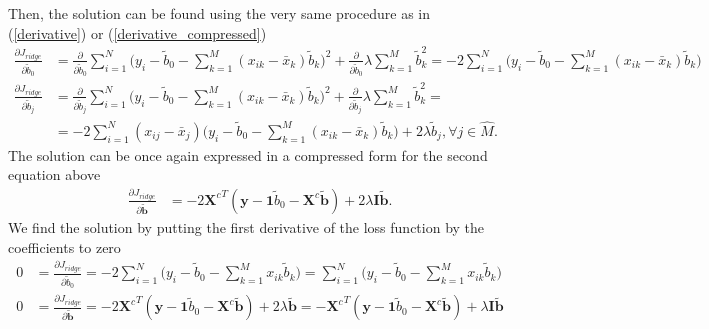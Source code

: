 \documentclass[11pt,oneside,czech,american]{book} %
\theoremstyle{plain}
\theoremstyle{definition}
\begin{document}
Then, the solution can be found using the very same procedure as in (\ref{derivative}) or (\ref{derivative_compressed})
\begin{equation}
	\begin{aligned}
		\frac{\partial J_{ridge}} {\partial \tilde{b}_0} &= \frac{\partial } {\partial \tilde{b}_0} \sum_{i=1}^{N} \Big(y_i - \tilde{b}_0 - \sum_{k=1}^{M} (x_{ik} - \bar{x}_k) \tilde{b}_k \Big)^2 + \frac{\partial } {\partial \tilde{b}_0} \lambda \sum_{k=1}^{M} \tilde{b}_k^2 = -2 \sum_{i=1}^{N} \Big(y_i - \tilde{b}_0 - \sum_{k=1}^{M} (x_{ik} - \bar{x}_k) \tilde{b}_k \Big) \\
		\frac{\partial J_{ridge}} {\partial \tilde{b}_j} &= \frac{\partial } {\partial \tilde{b}_j} \sum_{i=1}^{N} \Big(y_i - \tilde{b}_0 - \sum_{k=1}^{M} (x_{ik} - \bar{x}_k) \tilde{b}_k \Big)^2 + \frac{\partial } {\partial \tilde{b}_j} \lambda \sum_{k=1}^{M} \tilde{b}_k^2 =\\ 
		&= -2 \sum_{i=1}^{N} (x_{ij} - \bar{x}_j) \Big(y_i - \tilde{b}_0 - \sum_{k=1}^{M} (x_{ik} - \bar{x}_k) \tilde{b}_k \Big) + 2 \lambda \tilde{b}_j , \forall j \in \hat{M}.
	\end{aligned}
	\label{derivative_ridge}
\end{equation}
The solution can be once again expressed in a compressed form for the second equation above
\begin{equation}
	\begin{aligned}
		\frac{\partial J_{ridge}} {\partial \bm{\tilde{b}}} &= -2 {\bm{X}^{c}}^{T} (\bm{y} - \bm{1}\tilde{b}_0 -\bm{X}^c\bm{\tilde{b}}) + 2\lambda \bm{I} \bm{\tilde{b}}.
	\end{aligned}
	\label{derivative_ridge_compressed}
\end{equation}
We find the solution by putting the first derivative of the loss function by the coefficients to zero
\begin{equation}
	\begin{aligned}
		0 &= \frac{\partial J_{ridge}} {\partial \tilde{b}_0} = -2 \sum_{i=1}^{N} \Big(y_i - \tilde{b}_0 - \sum_{k=1}^{M} x_{ik} \tilde{b}_k \Big) = \sum_{i=1}^{N} \Big(y_i - \tilde{b}_0 - \sum_{k=1}^{M} x_{ik} \tilde{b}_k \Big)\\
		0 &= \frac{\partial J_{ridge}} {\partial \bm{\tilde{b}}} = -2{\bm{X}^{c}}^{T} (\bm{y} - \bm{1}\tilde{b}_0 -\bm{X}^c\bm{\tilde{b}}) + 2\lambda \bm{\tilde{b}} = -{\bm{X}^{c}}^{T} (\bm{y} - \bm{1}\tilde{b}_0 - \bm{X}^c\bm{\tilde{b}}) + \lambda \bm{I}\bm{\tilde{b}}
	\end{aligned}
\end{equation}
\end{document}
